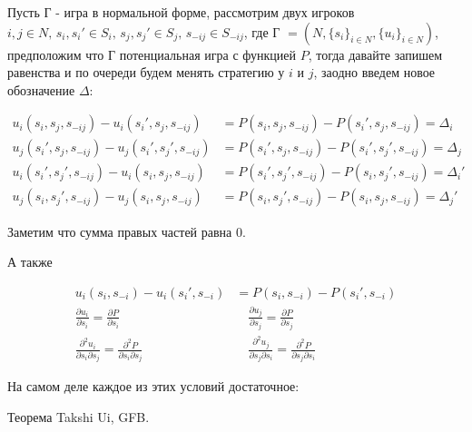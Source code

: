 Пусть Г - игра в нормальной форме, рассмотрим двух игроков $i, j \in N, \, s_i, s_i' \in S_i, \, s_j, s_j' \in S_j, \, s_{-ij} \in S_{-ij}$, где Г  $= (N, \{s_i\}_{i \in N}, \{u_i\}_{i \in N})$, предположим что Г потенциальная игра с функцией  $P$, тогда давайте запишем равенства и по очереди будем менять стратегию у $i$ и  $j$, заодно введем новое обозначение $\Delta$:

\begin{align*}
	u_i(s_i, s_j, s_{-ij}) - u_i(s_i', s_j, s_{-ij}) &= P(s_i, s_j, s_{-ij}) - P(s_i', s_j, s_{-ij}) = \Delta_i \\
	u_j(s_i', s_j, s_{-ij}) - u_j(s_i', s_j', s_{-ij}) &= P(s_i', s_j, s_{-ij}) - P(s_i', s_j', s_{-ij}) = \Delta_j \\
	u_i(s_i', s_j', s_{-ij}) - u_i(s_i, s_j, s_{-ij}) &= P(s_i', s_j', s_{-ij}) - P(s_i, s_j', s_{-ij}) = \Delta_i' \\
	u_j(s_i, s_j', s_{-ij}) - u_j(s_i, s_j, s_{-ij}) &= P(s_i, s_j', s_{-ij}) - P(s_i, s_j, s_{-ij}) = \Delta_j'
\end{align*}

Заметим что сумма правых частей равна 0.

А также

\begin{align*}
	u_i(s_i, s_{-i}) - u_i(s_i', s_{-i}) &= P(s_i, s_{-i}) - P(s_i', s_{-i}) \\
	\frac{\partial u_i}{\partial s_i} = \frac{\partial P}{\partial s_i} \quad&\quad \frac{\partial u_j}{\partial s_j} = \frac{\partial P}{\partial s_j} \\
	\frac{\partial^2 u_i}{\partial s_i \partial s_j} = \frac{\partial^2 P}{\partial s_i \partial s_j} \quad&\quad \frac{\partial^2 u_j}{\partial s_j \partial s_i} = \frac{\partial^2 P}{\partial s_j \partial s_i}
\end{align*}


На самом деле каждое из этих условий достаточное:

Теорема Takshi Ui, GFB.

